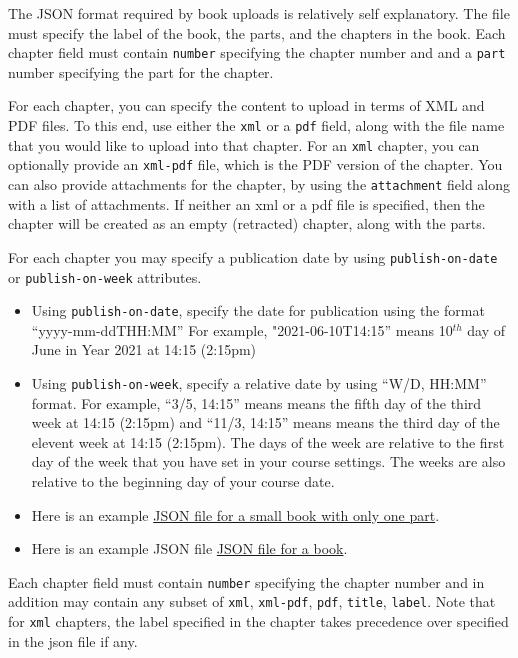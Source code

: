 \begin{gram}
The JSON format required by book uploads is relatively self explanatory.
The file must specify the label of the book, the parts, and the chapters in the book. 
%
Each chapter field must contain \verb|number| specifying the chapter
number and and a \verb|part| number specifying the part for the chapter.

For each chapter, you can specify the content to upload in terms of
XML and PDF files.  To this end, use either the \lstinline{xml} or a
\lstinline{pdf} field, along with the file name that you would like to
upload into that chapter.
%
For an \lstinline{xml} chapter, you can optionally provide an
\lstinline{xml-pdf} file, which is the PDF version of the chapter.
%
You can also provide attachments for the chapter, by using the
\lstinline{attachment} field along with a list of attachments.
%
If neither an xml or a pdf file is specified, then the chapter will be
created as an empty (retracted) chapter, along with the parts.


For each chapter you may specify a publication date by using
\verb|publish-on-date| or \verb|publish-on-week| attributes.


\begin{itemize}
\item Using \verb|publish-on-date|, specify the date for publication
  using the format ``yyyy-mm-ddTHH:MM'' For example,
  "2021-06-10T14:15'' means 10$^{th}$ day of June in Year 2021 at
  14:15 (2:15pm)
\item Using \verb|publish-on-week|, specify a relative date by using
  ``W/D, HH:MM'' format.  For example, ``3/5, 14:15'' means means the
  fifth day of the third week at 14:15 (2:15pm) and ``11/3, 14:15''
  means means the third day of the elevent week at 14:15 (2:15pm).
  The days of the week are relative to the first day of the week that
  you have set in your course settings.  The weeks are also relative
  to the beginning day of your course date.
\end{itemize}


\begin{itemize}
\item Here is an example 
\href{file://cli/attachments/booklet-example.json}
{JSON file for a small book with only one part}.
\item Here is an example JSON file 
\href{file://cli/attachment/book-example.json}
{JSON file for a book}.
\end{itemize}

Each chapter field must contain \verb|number| specifying the chapter
number and in addition may contain any subset of \verb|xml|,
\verb|xml-pdf|, \verb|pdf|, \verb|title|, \verb|label|.  Note that for
\verb|xml| chapters, the label specified in the chapter takes
precedence over specified in the json file if any.

\end{gram}


